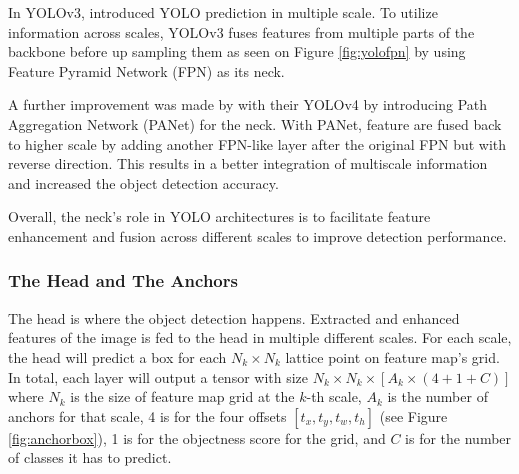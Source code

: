     In YOLOv3, \textcite{yolov3} introduced YOLO prediction in multiple scale.
    To utilize information across scales, YOLOv3 fuses features 
    from multiple parts of the backbone before up sampling them as seen on Figure \ref{fig:yolofpn} 
    by using Feature Pyramid Network (FPN) as its neck. 

    A further improvement was made by \textcite{yolov4} with their YOLOv4 by introducing Path 
    Aggregation Network (PANet) for the neck. 
    With PANet, feature are fused back to higher scale by adding another FPN-like layer after the original FPN
    but with reverse direction. This results in a better integration of multiscale information and increased the object detection accuracy.

    Overall, the neck's role in YOLO architectures is to facilitate feature enhancement and fusion across different scales to improve detection performance.
  
  
 

  
    \subsubsection{The Head and The Anchors}

    The head is where the object detection happens. Extracted and enhanced features of the image is fed to the head 
    in multiple different scales. For each scale, the head will predict a box for each $N_k \times N_k$
    lattice point on feature map's grid. In total, each layer will output a tensor with size
    $N_k \times N_k \times [A_k \times (4+1+C)]$ where $N_k$ is the size of feature map grid at the $k$-th scale,
    $A_k$ is the number of anchors for that scale, 4 is for the four offsets $[t_x, t_y, t_w, t_h]$ (see Figure 
    \ref{fig:anchorbox}), 1 is for the objectness score for the grid, and $C$ is for the number of classes it has
    to predict.
    
